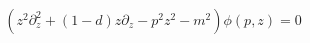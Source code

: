 \begin{equation}
(z^2 \partial_z^2+(1-d) z\partial_z-p^2 z^2-m^2)\phi(p,z)=0
\label{eqmapp}
\end{equation}

